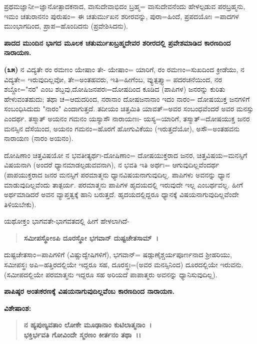 ಪ್ರಥಮಜ್ಞಾನೀ=ಜ್ಞಾನೋತ್ಪಾದಕನಾದ, ವಾಸುದೇವಾಭಿದಂ ಬ್ರಹ್ಮ= ವಾಸುದೇವನೆಂದು ಹೇಳಲ್ಪಡುವ ಪರಬ್ರಹ್ಮನು, ಇಮಂ ಚತುರಾನನಂ ಪುರುಷಂ= ಈ ಚತುರ್ಮುಖನ ಶರೀರವನ್ನು, ಪುರಾ=ಹಿಂದೆ, ಪ್ರಪದಯೋಃ =ಪಾದಗಳ ಮುಂಭಾಗದಿಂದ, ಪ್ರಾಪ=ಹೊಂದಿದನು (ಪ್ರವೇಶಿಸಿದನು).

\begin{center}
\textbf{ಪಾದದ ಮುಂದಿನ ಭಾಗದ ಮೂಲಕ ಚತುರ್ಮುಖಬ್ರಹ್ಮದೇವರ ಶರೀರದಲ್ಲಿ ಪ್ರವೇಶಮಾಡಿದ ಕಾರಣದಿಂದ ನಾರಾಯಣ.}
\end{center}

\textbf{(೩೫)} ನ ವಿದ್ಯತೇ ರಂ ರಮಣಂ ಯೇಷಾಂ ತೇ- ಯೇಷಾಂ= ಯಾರಿಗೆ, ರಂ ರಮಣಂ=ಸುಖದಿಂದ ಕ್ರೀಡೆಯು, ನ ವಿದ್ಯತೇ= ಇರುವುದಿಲ್ಲವೋ, ತೇ=ಅಂತಹವರು, ಇತಿ=ಹೀಗೆಂಬ, ವ್ಯುತ್ಪತ್ತ್ಯಾ= ಪದರಚನೆಯಿಂದ, ನರ ಶಬ್ದೋ="ನರ" ಎಂಬ ಶಬ್ದವು,\break ದೋಷಿಜನಪರಃ=ದೋಷದಿಂದ ಕೂಡಿದ (ಪಾಪಿಗಳ) ಜನರನ್ನು ಕುರಿತು ಹೇಳುವಂತಹುದು; ತಥಾ ಚ=ಆದುದರಿಂದ, ನರಾನಾಂ ದೋಷಜನಾನಾಂ ಇದಂ ನಾರಂ= ದೋಷಯುಕ್ತ ಜನಗಳಿಗೆ ಸಂಬಂಧಿಸಿದುದು "ನಾರಂ" ಎಂದಾಗುತ್ತದೆ. ತದೀಯಂ ಚಿತ್ತಮಿತಿ ಯಾವತ್=ಅವರ ಸಂಬಂಧವೆಂದರೆ ಅವರ ಮನಸ್ಸು ಎಂದರ್ಥ. ತಸ್ಮಾತ್ ಅಯನಂ ಗಮನಂ ಯಸ್ಯಾಸೌ ನಾರಾಯಣಃ- ಯಸ್ಯ=ಯಾರಿಗೆ, ತಸ್ಮಾತ್=ದೋಷಯುಕ್ತ ಜನರ ಮನಸ್ಸಿನ ದೆಸೆಯಿಂದ, ಅಯನಂ ಗಮನಂ=ಹೊರಗೆ ಹೋಗುವಿಕೆಯು (ಇರುತ್ತದೆಯೋ), ಅಸೌ=ಅಂತಹವನು ನಾರಾಯಣ (ನಾರಂ ಅಯನಂ).

ದೋಷಿಣಾಂ ಚಿತ್ತವಿಷಯೋ ನ ಭವತೀತ್ಯರ್ಥಃ-ದೋಷಿಣಾಂ= ದೋಷಯುಕ್ತರಾದ ಜನರ, ಚಿತ್ತವಿಷಯ=ಮನಸ್ಸಿಗೆ ವಿಷಯನಾಗಿ (ಅಂದರೆ ಧ್ಯಾನಮಾಡಲ್ಪಡುವವನಾಗಿ), ನ ಭವತಿ ಇತಿ ಅರ್ಥಃ= ಆಗುವುದಿಲ್ಲವೆಂದರ್ಥ (ಪಾಪಯುಕ್ತರಾದ ಜನರ ಮನಸ್ಸಿಗೆ ಪರಮಾತ್ಮನು ಧ್ಯಾನವಿಷಯನಾಗುವುದಿಲ್ಲ. ಪಾಪಿಗಳು ಅವನನ್ನು ಧ್ಯಾನ ಮಾಡುವುದಿಲ್ಲವೆಂದು ತಾತ್ಪರ್ಯ. ಪರಮಾತ್ಮನು ಪಾಪಿಗಳ ಹೃದಯದಲ್ಲಿ ಇರುವುದೇ ಇಲ್ಲ ಎಂಬರ್ಥವಲ್ಲ. ಹೀಗೆ ಅರ್ಥಮಾಡಿದರೆ ಅವನ ವ್ಯಾಪ್ತತ್ವಕ್ಕೆ ಹಾನಿ ಬರುತ್ತದೆ. ಹೃದಯದಲ್ಲಿದ್ದರೂ ಧ್ಯಾನಕ್ಕೆ ವಿಷಯನಾಗುವುದಿಲ್ಲವೆಂದೇ ತಿಳಿಯಬೇಕು).

ಯಥೋಕ್ತಂ ಭಾಗವತೇ-ಭಾಗವತದಲ್ಲಿ ಹೀಗೆ ಹೇಳಲಾಗಿದೆ-

\begin{verse}
\textbf{ಸಮೀಪಸ್ಥೋಽಪಿ ದೂರಸ್ಥೋ ಭಗವಾನ್ ದುಷ್ಟಚೇತಸಾಮ್~।}
\end{verse}

ದುಷ್ಟಚೇತಸಾಂ=ಪಾಪಿಗಳಿಗೆ (ವಿಷ್ಣುದ್ವೇಷಿಗಳಿಗೆ), ಭಗವಾನ್= ಷಡ್ಗುಣೈಶ್ಚರ್ಯಪೂರ್ಣನಾದ ಶ‍್ರೀಹರಿಯು, ಸಮೀಪಸ್ಥಃ ಅಪಿ=ಹತ್ತಿರದಲ್ಲಿಯೇ ಇದ್ದರೂ ಸಹ, ದೂರಸ್ಥಃ=(ಅವರ ಮನಸ್ಸಿನಿಂದ) ದೂರದಲ್ಲಿಯೇ ಇರುವನು. (ಸಮೀಪದಲ್ಲಿಯೇ ಪರಮಾತ್ಮನು ಇದ್ದರೂ ಸಹ ಅರಿಯದೆ ಪಾಪಾತ್ಮರು ಅವನನ್ನು ಧ್ಯಾನಿಸುವುದಿಲ್ಲ).

\begin{center}
\textbf{ಪಾಪಿಷ್ಠರ ಅಂತಃಕರಣಕ್ಕೆ ವಿಷಯನಾಗುವುದಿಲ್ಲವೆಂಬ ಕಾರಣದಿಂದ ನಾರಾಯಣ.}
\end{center}

\noindent
\textbf{ವಿಶೇಷಾಂಶ:\enginline{-}}

\begin{verse}
\textbf{ನ ಹ್ಯಪುಣ್ಯವತಾಂ ಲೋಕೇ ಮೂಢಾನಾಂ ಕುಟಿಲಾತ್ಮನಾಂ~।}\\\textbf{ಭಕ್ತಿರ್ಭವತಿ ಗೋವಿಂದೇ ಸ್ಮರಣಂ ಕೀರ್ತನಂ ತಥಾ~।।}
\end{verse}

